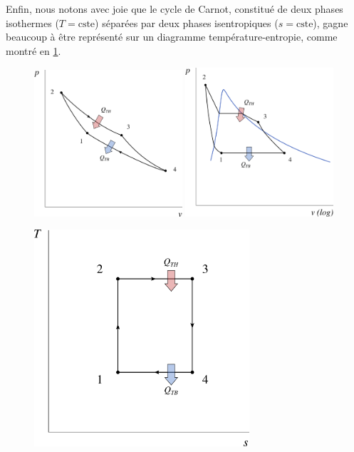 		\clearfloats
		Enfin, nous notons avec joie que le cycle de Carnot, constitué de deux phases isothermes ($T = \text{cste}$) séparées par deux phases isentropiques ($s = \text{cste}$), gagne beaucoup à être représenté sur un diagramme température-entropie, comme montré en \cref{fig_ts_carnot}.

		\begin{figure}[htb]%
			\begin{center}
				\includegraphics[width=0.49\textwidth]{images/pv_carnot_gp.png}
				\includegraphics[width=0.49\textwidth]{images/pv_carnot_lv.png}
				\vspace{1cm}
				
				\includegraphics[width=8cm]{images/ts_carnot.png}
			\end{center}
			\label{fig_ts_carnot}
		\end{figure}

